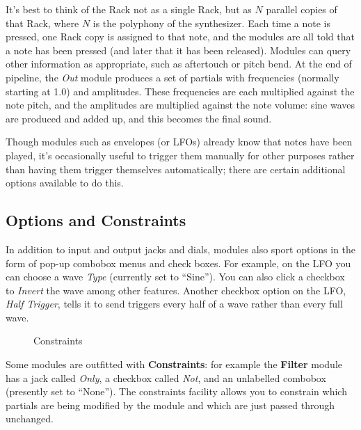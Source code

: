 \documentclass{article}
\begin{document}
It's best to think of the Rack not as a single Rack, but as \(N\) parallel copies of that Rack, where \(N\) is the polyphony of the synthesizer.  Each time a note is pressed, one Rack copy is assigned to that note, and the modules are all told that a note has been pressed (and later that it has been released).  Modules can query other information as appropriate, such as aftertouch or pitch bend.  At the end of pipeline, the {\it Out} module produces a set of partials with frequencies (normally starting at 1.0) and amplitudes.  These frequencies are each multiplied against the note pitch, and the amplitudes are multiplied against the note volume: sine waves are produced and added up, and this becomes the final sound.

Though modules such as envelopes (or LFOs) already know that notes have been played, it's occasionally useful to trigger them manually for other purposes rather than having them trigger themselves automatically; there are certain additional options available to do this.

\subsection{Options and Constraints}
\label{constraints}

In addition to input and output jacks and dials, modules also sport options in the form of pop-up combobox menus and check boxes.  For example, on the LFO you can choose a wave {\it Type} (currently set to ``Sine'').  You can also click a checkbox to {\it Invert} the wave among other features.  Another checkbox option on the LFO, {\it Half Trigger}, tells it to send triggers every half of a wave rather than every full wave.

\begin{wrapfigure}{r}{1.25in}
\vspace{-2em}
{\setlength\fboxsep{0in}}
\vspace{-2em}
\caption{Constraints}
\vspace{-2em}
\label{constraintfacility}
\end{wrapfigure}

Some modules are outfitted with {\bf Constraints}: for example the {\bf Filter} module has a jack called {\it Only}, a checkbox called {\it Not}, and an unlabelled combobox (presently set to ``None'').  The constraints facility allows you to constrain which partials are being modified by the module and which are just passed through unchanged. 
\end{document}
